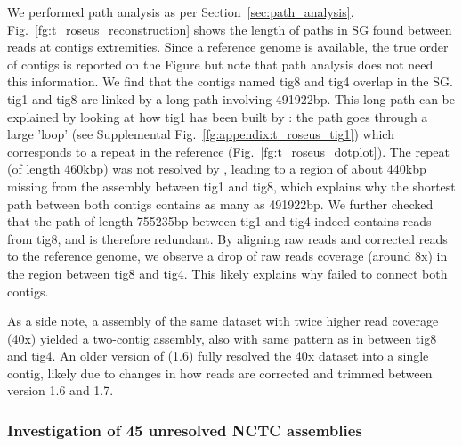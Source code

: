 \documentclass[./main.tex]{subfiles}
\newcommand{\modafterreview}[1]{#1}
\begin{document}
We performed path analysis as per Section~\ref{sec:path_analysis}.
Fig.~\ref{fg:t_roseus_reconstruction} shows the length of paths in SG found between reads at \canu contigs extremities. Since a reference genome is available, the true order of contigs is reported on the Figure but note that path analysis does not need this information.
%
We find that the \canu contigs named tig8 and tig4 \modafterreview{overlap in the SG}. 
%
tig1 and tig8 are linked by a long path involving \modafterreview{491922bp}. This long path can be explained by looking at how tig1 has been built by \canu: the path goes through a large \modafterreview{'loop'} (see Supplemental Fig.~\ref{fg:appendix:t_roseus_tig1}) which corresponds to a repeat in the reference (Fig.~\ref{fg:t_roseus_dotplot}). The repeat (of length 460kbp) was not resolved by \canu, leading to a region of about 440kbp missing from the assembly between tig1 and tig8, which explains why the shortest path between both contigs contains as many as \modafterreview{491922bp}. 
We further checked that the path of length \modafterreview{755235bp} between tig1 and tig4 indeed contains reads from tig8, and is therefore redundant.
By aligning raw reads and \canu corrected reads to the reference genome, we observe a drop of raw reads coverage (around 8x) in the region between tig8 and tig4. This likely explains why \canu failed to connect both contigs.

As a side note, a \canu assembly of the same dataset with twice higher read coverage (40x) yielded a two-contig assembly, also with same pattern as in between tig8 and tig4. An older version of \canu (1.6) fully resolved the 40x dataset into a single contig, likely due to changes in how reads are corrected and trimmed between version 1.6 and 1.7.

\subsubsection{Investigation of 45 unresolved NCTC assemblies}
\end{document}
